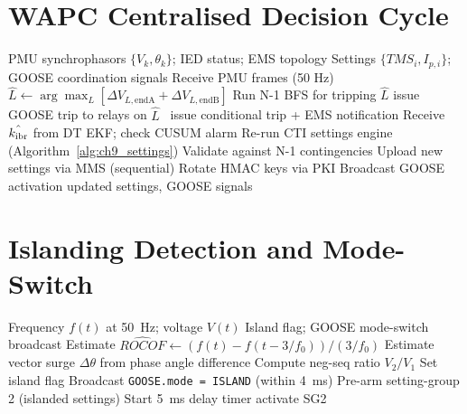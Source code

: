 \section{WAPC Centralised Decision Cycle}
\label{app:alg_wapc}

\begin{algorithm}[htbp]
\caption{WAPC Centralised Decision Cycle (200~ms cycle)}
\label{alg:app_wapc}
\begin{algorithmic}[1]
\Require PMU synchrophasors $\{V_k, \theta_k\}$; IED status; EMS topology
\Ensure Settings $\{TMS_i, I_{p,i}\}$; GOOSE coordination signals
\State Receive PMU frames (50 Hz)
\State {}
  \State $\hat{L} \leftarrow \arg\max_L [\Delta V_{L,\mathrm{end A}} + \Delta V_{L,\mathrm{end B}}]$
  \State Run N-1 BFS for tripping $\hat{L}$
   issue GOOSE trip to relays on $\hat{L}$
  \Else\ issue conditional trip + EMS notification
  \EndIf
\EndIf
\State {}
\State Receive $\hat{k_\mathrm{ibr}}$ from DT EKF; check CUSUM alarm
  \State Re-run CTI settings engine (Algorithm~\ref{alg:ch9_settings})
  \State Validate against N-1 contingencies
  \State Upload new settings via MMS (sequential)
  \State Rotate HMAC keys via PKI
  \State Broadcast GOOSE activation
\EndIf
\State \Return updated settings, GOOSE signals
\end{algorithmic}
\end{algorithm}

\section{Islanding Detection and Mode-Switch}
\label{app:alg_island}

\begin{algorithm}[htbp]
\caption{ROCOF Islanding Detection and GFM Mode-Switch (Ch.~\ref{ch:microgrid})}
\label{alg:app_island}
\begin{algorithmic}[1]
\Require Frequency $f(t)$ at 50~Hz; voltage $V(t)$
\Ensure Island flag; GOOSE mode-switch broadcast
\State Estimate $\widehat{ROCOF} \leftarrow (f(t) - f(t - 3/f_0)) / (3/f_0)$
\State Estimate vector surge $\Delta\theta$ from phase angle difference
\State Compute neg-seq ratio $V_2/V_1$
  \State Set island flag
  \State Broadcast \texttt{GOOSE.mode = ISLAND} (within 4~ms)
  \State Pre-arm setting-group 2 (islanded settings)
  \State Start 5~ms delay timer
   activate SG2
  \EndIf
\EndIf
\end{algorithmic}
\end{algorithm}
